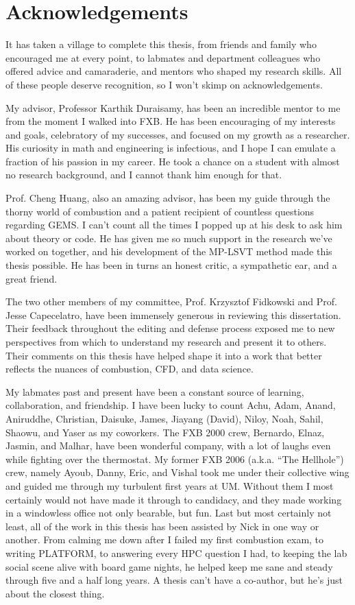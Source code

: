\chapter{Acknowledgements}

It has taken a village to complete this thesis, from friends and family who encouraged me at every point, to labmates and department colleagues who offered advice and camaraderie, and mentors who shaped my research skills. All of these people deserve recognition, so I won't skimp on acknowledgements.

My advisor, Professor Karthik Duraisamy, has been an incredible mentor to me from the moment I walked into FXB. He has been encouraging of my interests and goals, celebratory of my successes, and focused on my growth as a researcher. His curiosity in math and engineering is infectious, and I hope I can emulate a fraction of his passion in my career. He took a chance on a student with almost no research background, and I cannot thank him enough for that.

Prof. Cheng Huang, also an amazing advisor, has been my guide through the thorny world of combustion and a patient recipient of countless questions regarding GEMS. I can't count all the times I popped up at his desk to ask him about theory or code. He has given me so much support in the research we've worked on together, and his development of the MP-LSVT method made this thesis possible. He has been in turns an honest critic, a sympathetic ear, and a great friend.

The two other members of my committee, Prof. Krzysztof Fidkowski and Prof. Jesse Capecelatro, have been immensely generous in reviewing this dissertation. Their feedback throughout the editing and defense process exposed me to new perspectives from which to understand my research and present it to others. Their comments on this thesis have helped shape it into a work that better reflects the nuances of combustion, CFD, and data science.

My labmates past and present have been a constant source of learning, collaboration, and friendship. I have been lucky to count Achu, Adam, Anand, Aniruddhe, Christian, Daisuke, James, Jiayang (David), Niloy, Noah, Sahil, Shaowu, and Yaser as my coworkers. The FXB 2000 crew, Bernardo, Elnaz, Jasmin, and Malhar, have been wonderful company, with a lot of laughs even while fighting over the thermostat. My former FXB 2006 (a.k.a. ``The Hellhole'') crew, namely Ayoub, Danny, Eric, and Vishal took me under their collective wing and guided me through my turbulent first years at UM. Without them I most certainly would not have made it through to candidacy, and they made working in a windowless office not only bearable, but fun. Last but most certainly not least, all of the work in this thesis has been assisted by Nick in one way or another. From calming me down after I failed my first combustion exam, to writing PLATFORM, to answering every HPC question I had, to keeping the lab social scene alive with board game nights, he helped keep me sane and steady through five and a half long years. A thesis can't have a co-author, but he's just about the closest thing.

